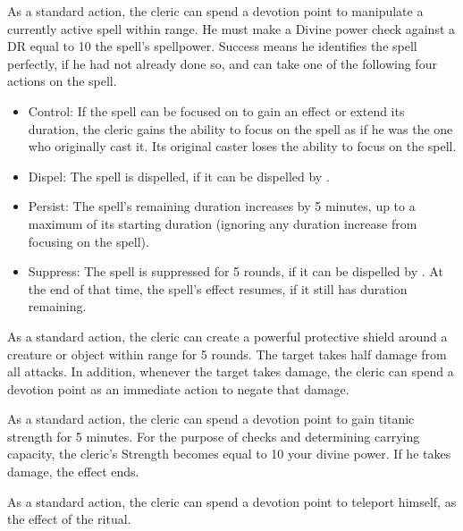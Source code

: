             As a standard action, the cleric can spend a devotion point to manipulate a currently active spell within \rngmed range.
            He must make a Divine power check against a DR equal to 10 \add the spell's spellpower.
            Success means he identifies the spell perfectly, if he had not already done so, and can take one of the following four actions on the spell.
            \begin{itemize}
                \item Control: If the spell can be focused on to gain an effect or extend its duration, the cleric gains the ability to focus on the spell as if he was the one who originally cast it.
                    Its original caster loses the ability to focus on the spell.
                \item Dispel: The spell is dispelled, if it can be dispelled by .
                \item Persist: The spell's remaining duration increases by 5 minutes, up to a maximum of its starting duration (ignoring any duration increase from focusing on the spell).
                \item Suppress: The spell is suppressed for 5 rounds, if it can be dispelled by .
                    At the end of that time, the spell's effect resumes, if it still has duration remaining.
            \end{itemize}

            As a standard action, the cleric can create a powerful protective shield around a creature or object within \rngclose range for 5 rounds.
            The target takes half damage from all attacks.
            In addition, whenever the target takes damage, the cleric can spend a devotion point as an immediate action to negate that damage.

            As a standard action, the cleric can spend a devotion point to gain titanic strength for 5 minutes.
            For the purpose of checks and determining carrying capacity, the cleric's Strength becomes equal to 10 \add your divine power.
            If he takes damage, the effect ends.

            As a standard action, the cleric can spend a devotion point to teleport himself, as the effect of the  ritual.

